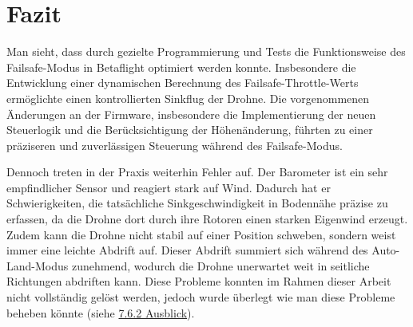 \section{Fazit}\label{sec:Fazit6}
\begin{comment}
In diesem Kapitel wird der Weg beschrieben, wie der Auto-Land-Modus der Drohne verbessert wurde, sodass sie kontrolliert landet und sich nach der Landung abschaltet. Am Anfang standen einfache Versuche, bei denen vor allem nach Gefühl vorgegangen wurde, weil das Verständnis für die Programmiersprache C noch fehlte. Schritt für Schritt wurden verschiedene Dateien wie mixer.c, failsafe.c und rx.c untersucht, um herauszufinden, wo und wie der entscheidende Throttle-Wert für den Failsafe-Modus berechnet wird.

Ein erster Ansatz, den Motoroutput direkt zu manipulieren, führte zu einem unerwarteten Fehlschlag: Die Drohne machte einen Vorwärtssalto und schaltete sich ab. Das Problem war, dass der Motoroutput nicht nur den Throttle-Wert, sondern auch Steuerwerte wie Roll und Nick enthält. Dadurch wurde die Drohne instabil.

Nach diesem Rückschlag konzentrierte sich die Arbeit auf die Dateien rx.c und rx.h, die die Kommunikation mit der Fernbedienung steuern. Dort wurde schliesslich die Funktion gefunden, die den Failsafe-Modus steuert. Durch Anpassung des Throttle-Werts in dieser Funktion und viele Tests konnte ein kontrolliertes Sinken der Drohne erreicht werden. Die Drohne landete am Ende zuverlässig und sicher, wodurch das gesetzte Ziel zumindest teilweise erfolgreich erreicht wurde.
\end{comment}


Man sieht, dass durch gezielte Programmierung und Tests die Funktionsweise des Failsafe-Modus in Betaflight optimiert werden konnte. Insbesondere die Entwicklung einer dynamischen Berechnung des Failsafe-Throttle-Werts ermöglichte einen kontrollierten Sinkflug der Drohne. Die vorgenommenen Änderungen an der Firmware, insbesondere die Implementierung der neuen Steuerlogik und die Berücksichtigung der Höhenänderung, führten zu einer präziseren und zuverlässigen Steuerung während des Failsafe-Modus. 

Dennoch treten in der Praxis weiterhin Fehler auf. Der Barometer ist ein sehr empfindlicher Sensor und reagiert stark auf Wind. Dadurch hat er Schwierigkeiten, die tatsächliche Sinkgeschwindigkeit in Bodennähe präzise zu erfassen, da die Drohne dort durch ihre Rotoren einen starken Eigenwind erzeugt. Zudem kann die Drohne nicht stabil auf einer Position schweben, sondern weist immer eine leichte Abdrift auf. Dieser Abdrift summiert sich während des Auto-Land-Modus zunehmend, wodurch die Drohne unerwartet weit in seitliche Richtungen abdriften kann. Diese Probleme konnten im Rahmen dieser Arbeit nicht vollständig gelöst werden, jedoch wurde überlegt wie man diese Probleme beheben könnte (siehe \hyperref[sec:ausblick]{7.6.2 Ausblick}).\label{probleme}

